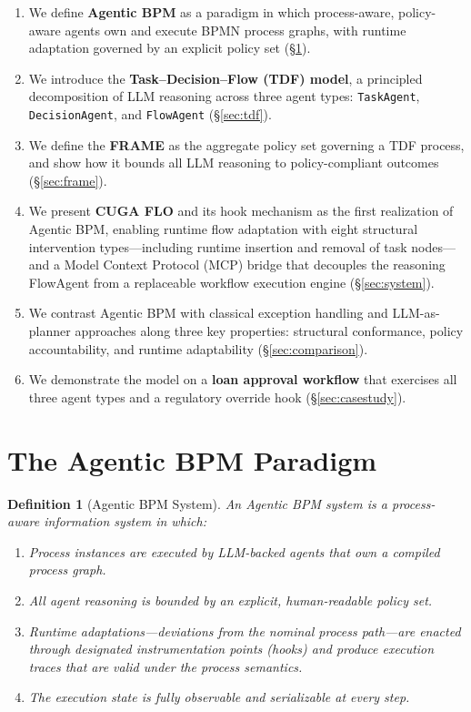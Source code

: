 \documentclass[11pt,a4paper]{article}
\newtheorem{definition}{Definition}
\begin{document}
\begin{enumerate}[label=\textbf{C\arabic*}., noitemsep]
  \item We define \textbf{Agentic BPM} as a paradigm in which process-aware,
        policy-aware agents own and execute BPMN process graphs, with runtime
        adaptation governed by an explicit policy set (\S\ref{sec:paradigm}).
  \item We introduce the \textbf{Task--Decision--Flow (TDF) model}, a principled
        decomposition of LLM reasoning across three agent types: \texttt{TaskAgent},
        \texttt{DecisionAgent}, and \texttt{FlowAgent} (\S\ref{sec:tdf}).
  \item We define the \textbf{FRAME} as the aggregate policy set governing a TDF
        process, and show how it bounds all LLM reasoning to policy-compliant
        outcomes (\S\ref{sec:frame}).
  \item We present \textbf{CUGA FLO} and its hook mechanism as the first
        realization of Agentic BPM, enabling runtime flow adaptation with eight
        structural intervention types---including runtime insertion and removal of
        task nodes---and a Model Context Protocol (MCP) bridge that decouples the
        reasoning FlowAgent from a replaceable workflow execution engine
        (\S\ref{sec:system}).
  \item We contrast Agentic BPM with classical exception handling and
        LLM-as-planner approaches along three key properties:
        structural conformance, policy accountability, and runtime adaptability
        (\S\ref{sec:comparison}).
  \item We demonstrate the model on a \textbf{loan approval workflow} that
        exercises all three agent types and a regulatory override hook
        (\S\ref{sec:casestudy}).
\end{enumerate}

\section{The Agentic BPM Paradigm}
\label{sec:paradigm}

\begin{definition}[Agentic BPM System]
An \emph{Agentic BPM system} is a process-aware information system in which:
\begin{enumerate}[noitemsep, label=(\roman*)]
  \item Process instances are executed by LLM-backed agents that own a compiled
        process graph.
  \item All agent reasoning is bounded by an explicit, human-readable policy set.
  \item Runtime adaptations---deviations from the nominal process path---are
        enacted through designated instrumentation points (hooks) and produce
        execution traces that are valid under the process semantics.
  \item The execution state is fully observable and serializable at every step.
\end{enumerate}
\end{definition}
\end{document}
